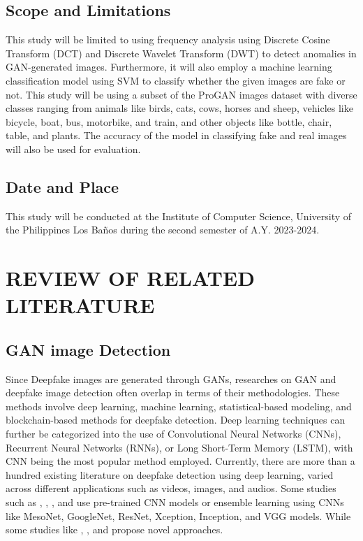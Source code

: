 \documentclass{icsthesis}
\begin{document}
\begin{mainmatter}
\subsection{Scope and Limitations}
This study will be limited to using frequency analysis using Discrete Cosine Transform (DCT) and Discrete Wavelet Transform (DWT) to detect anomalies in GAN-generated images. Furthermore, it will also employ a machine learning classification model using SVM to classify whether the given images are fake or not. This study will be using a subset of the ProGAN images dataset with diverse classes ranging from animals like birds, cats, cows, horses and sheep, vehicles like bicycle, boat, bus, motorbike, and train, and other objects like bottle, chair, table, and plants. The accuracy of the model in classifying fake and real images will also be used for evaluation. 


\subsection{Date and Place}
This study will be conducted at the Institute of Computer Science, University of the Philippines Los Baños during the second semester of A.Y. 2023-2024.
		
\section{REVIEW OF RELATED LITERATURE}

\subsection{GAN image Detection}

\par Since Deepfake images are generated through GANs, researches on GAN and deepfake image detection often overlap in terms of their methodologies. These methods involve deep learning, machine learning, statistical-based modeling, and blockchain-based methods for deepfake detection. Deep learning techniques can further be categorized into the use of Convolutional Neural Networks (CNNs), Recurrent Neural Networks (RNNs), or Long Short-Term Memory (LSTM), with CNN being the most popular method employed. Currently, there are more than a hundred existing literature on deepfake detection using deep learning, varied across different applications such as videos, images, and audios. Some studies such as \cite{deepfake-fourier-cnn}, \cite{deepfake-spatio}, \cite{deepfake-error-level}, and \cite{deepfake-image} use pre-trained CNN models or ensemble learning using CNNs like MesoNet, GoogleNet, ResNet, Xception, Inception, and VGG models. While some studies like \cite{deepfake-em}, \cite{deepfake-mesonet}, and \cite{novel-deepfake} propose novel approaches.


\end{mainmatter}
\end{document}

